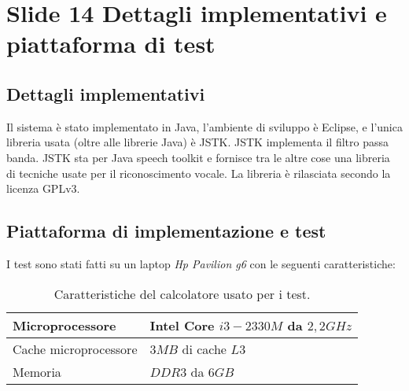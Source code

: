 \section{Slide 14 Dettagli implementativi e piattaforma di test}
\subsection{Dettagli implementativi}
Il sistema \`e stato implementato in Java, l'ambiente di sviluppo \`e Eclipse, e l'unica libreria usata (oltre alle librerie Java) \`e JSTK.
JSTK implementa il filtro passa banda.
JSTK sta per Java speech toolkit e fornisce tra le altre cose una libreria di tecniche usate per il riconoscimento vocale. 
La libreria \`e rilasciata secondo la licenza GPLv3.

\subsection{Piattaforma di implementazione e test}
    I test sono stati fatti su un laptop \emph{Hp Pavilion g6} con le seguenti caratteristiche:
    \begin{center}
      \begin{table}[!h]
      \centering
      \begin{tabular}{l|l}
	Microprocessore
      &
	Intel Core $i3-2330M$ da $2,2GHz$
      \\\hline
	Cache microprocessore
      &
	$3 MB$ di cache $L3$
      \\\hline
	Memoria
      &
	$DDR3$ da $6 GB$
    \end{tabular}
    \caption{Caratteristiche del calcolatore usato per i test.}
    \end{table}
  \end{center}

